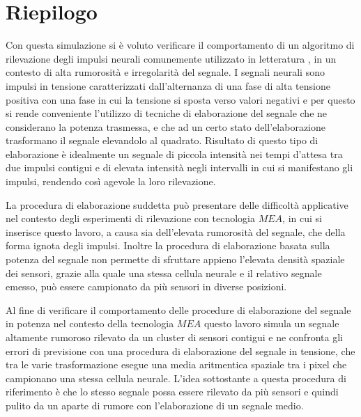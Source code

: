 \section{Riepilogo}
\label{conclusioni}

Con questa simulazione si è voluto verificare il comportamento di un algoritmo di rilevazione degli impulsi neurali comunemente utilizzato in letteratura \cite{Lambacher2011}, in un contesto di alta rumorosità e irregolarità del segnale. I segnali neurali sono impulsi in tensione caratterizzati dall'alternanza di una fase di alta tensione positiva con una fase in cui la tensione si sposta verso valori negativi e per questo si rende conveniente l'utilizzo di tecniche di elaborazione del segnale che ne considerano la potenza trasmessa, e che ad un certo stato dell'elaborazione trasformano il segnale elevandolo al quadrato. Risultato di questo tipo di elaborazione è idealmente un segnale di piccola intensità nei tempi d'attesa tra due impulsi contigui e di elevata intensità negli intervalli in cui si manifestano gli impulsi, rendendo così agevole la loro rilevazione.

La procedura di elaborazione suddetta può presentare delle difficoltà applicative nel contesto degli esperimenti di rilevazione con tecnologia $MEA$, in cui si inserisce questo lavoro, a causa sia dell'elevata rumorosità del segnale, che della forma ignota degli impulsi. Inoltre la procedura di elaborazione basata sulla potenza del segnale non permette di sfruttare appieno l'elevata densità spaziale dei sensori, grazie alla quale una stessa cellula neurale e il relativo segnale emesso, può essere campionato da più sensori in diverse posizioni.

Al fine di verificare il comportamento delle procedure di elaborazione del segnale in potenza nel contesto della tecnologia $MEA$ questo lavoro simula un segnale altamente rumoroso rilevato da un cluster di sensori contigui e ne confronta gli errori di previsione con una procedura di elaborazione del segnale in tensione, che tra le varie trasformazione esegue una media aritmentica spaziale tra i pixel che campionano una stessa cellula neurale. L'idea sottostante a questa procedura di riferimento è che lo stesso segnale possa essere rilevato da più sensori e quindi pulito da un aparte di rumore con l'elaborazione di un segnale medio.


